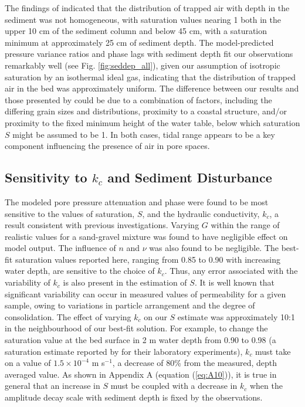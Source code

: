 The findings of \citet{Michallet_etal2009} indicated that the distribution of trapped air with depth in the sediment was not homogeneous, with saturation values nearing 1 both in the upper 10 cm of the sediment column and below 45 cm, with a saturation minimum at approximately 25 cm of sediment depth. The model-predicted pressure variance ratios and phase lags with sediment depth fit our observations remarkably well (see Fig. \ref{fig:seddep_all}), given our assumption  of isotropic saturation by an isothermal ideal gas, indicating that the distribution of trapped air in the bed was approximately uniform. The difference between our results and those presented by \citet{Michallet_etal2009} could be due to a combination of factors, including the differing grain sizes and distributions, proximity to a coastal structure, and/or proximity to the fixed minimum height of the water table, below which saturation $S$ might be assumed to be 1. In both cases, tidal range appears to be a key component influencing the presence of air in pore spaces.

\subsection{Sensitivity to $k_c$ and Sediment Disturbance}\label{Disc:kc}

The modeled pore pressure attenuation and phase were found to be most sensitive to the values of saturation, $S$, and the hydraulic conductivity, $k_{c}$, a result consistent with previous investigations. Varying $G$ within the range of realistic values for a sand-gravel mixture was found to have negligible effect on model output. The influence of $n$ and $\nu$ was also found to be negligible. The best-fit saturation values reported here, ranging from 0.85 to 0.90 with increasing water depth, are sensitive to the choice of $k_{c}$. Thus, any error associated with the variability of $k_{c}$ is also present in the estimation of $S$. It is well known \citep{Baird_etal1997, Horn_etal1998} that significant variability can occur in measured values of permeability for a given sample, owing to variations in particle arrangement and the degree of consolidation. The effect of varying $k_{c}$ on our $S$ estimate was approximately 10:1 in the neighbourhood of our best-fit solution. For example, to change the saturation value at the bed surface in 2 m water depth from 0.90 to 0.98 (a saturation estimate reported by \citet{Yamamoto_etal1978} for their laboratory experiments), $k_{c}$ must take on a value of $1.5\times 10^{-4}$  m s$^{-1}$, a decrease of 80\% from the measured, depth averaged value. As shown in Appendix A (equation (\ref{eq:A10})), it is true in general that an increase in $S$ must be coupled with a decrease in $k_c$ when the amplitude decay scale with sediment depth is fixed by the observations.

